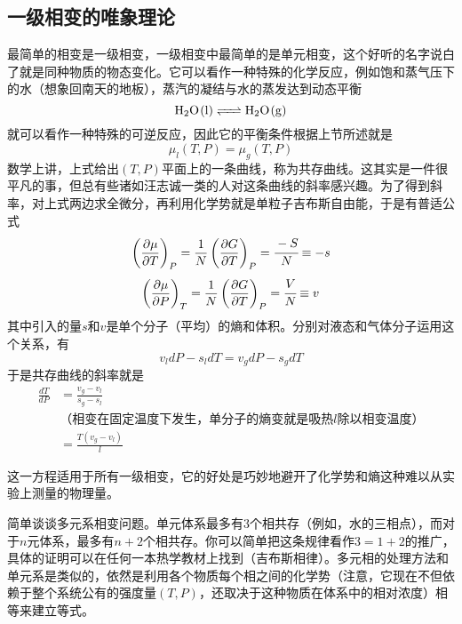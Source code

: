 \documentclass[a4paper,11pt]{ctexart}
\newcommand{\beq}{\begin{equation}}
\newcommand{\eeq}{\end{equation}}
\newcommand{\bea}{\begin{equation}\begin{aligned}}
\newcommand{\eea}{\end{aligned}\end{equation}}
\newcommand{\red}{\color{red}}
\begin{document}
\subsection{一级相变的唯象理论}
最简单的相变是一级相变，一级相变中最简单的是单元相变，这个好听的名字说白了就是同种物质的物态变化。它可以看作一种特殊的化学反应，例如饱和蒸气压下的水（想象回南天的地板），蒸汽的凝结与水的蒸发达到动态平衡
\beq
\ce{H2O(l) <=> H2O(g)}
\eeq
就可以看作一种特殊的可逆反应，因此它的平衡条件根据上节所述就是
\beq
\mu_l(T,P) = \mu_g(T,P)
\eeq
数学上讲，上式给出$(T,P)$平面上的一条曲线，称为共存曲线。这其实是一件很平凡的事，但总有些诸如汪志诚一类的人对这条曲线的斜率感兴趣。为了得到斜率，对上式两边求全微分，再利用化学势就是单粒子吉布斯自由能，于是有普适公式
\beq
\left(\frac{\partial \mu}{\partial T}\right)_P = \frac{1}{N} \left(\frac{\partial G}{\partial T}\right)_P = \cfrac{-S}{N} \equiv -s
\eeq
\beq
\left(\frac{\partial \mu}{\partial P}\right)_T = \frac{1}{N} \left(\frac{\partial G}{\partial T}\right)_P = \cfrac{V}{N} \equiv v 
\eeq
其中引入的量$s$和$v$是单个分子（平均）的熵和体积。分别对液态和气体分子运用这个关系，有
\beq
v_l dP - s_l dT = v_g dP - s_g dT
\eeq
于是共存曲线的斜率就是
\bea
\frac{dT}{dP} &= \frac{v_g - v_l}{s_g - s_l} \\
&\text{（相变在固定温度下发生，单分子的熵变就是吸热$l$除以相变温度）} \\
&= \frac{T(v_g - v_l)}{l}
\eea
\par
这一方程适用于所有一级相变，它的好处是巧妙地避开了化学势和熵这种难以从实验上测量的物理量。
\par
简单谈谈多元系相变问题。单元体系最多有3个相共存（例如，水的三相点），{\red 而对于$n$元体系，最多有$n+2$个相共存}。你可以简单把这条规律看作$3 = 1+2$的推广，具体的证明可以在任何一本热学教材上找到（{\red 吉布斯相律}）。多元相的处理方法和单元系是类似的，依然是利用各个物质每个相之间的化学势（注意，它现在不但依赖于整个系统公有的强度量$(T,P)$，还取决于这种物质在体系中的相对浓度）相等来建立等式。
\end{document}
